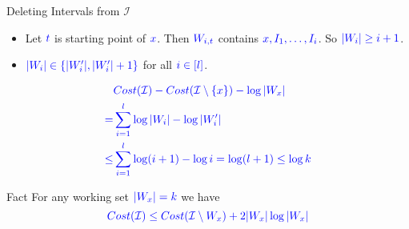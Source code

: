 \documentclass[10pt]{beamer}
\begin{document}
\begin{frame}{Deleting Intervals from $\mathcal{I}$}
	\begin{itemize}
		\item Let $\mathcolor{blue}{t}$ is starting point of $\mathcolor{blue}{x}$. Then $\mathcolor{blue}{W_{i,t}}$ contains $\mathcolor{blue}{x, I_1,\dots, I_i}$. So $\mathcolor{blue}{|W_i|\geq i+1}$.
		\item $\mathcolor{blue}{|W_i|\in\{|W_i'|,|W_i'|+1\}}$ for all $\mathcolor{blue}{i\in[l]}$.
	\end{itemize}
	\begin{align*}
		                       & \mathcolor{blue}{Cost(\mathcal{I})-Cost(\mathcal{I}\setminus \{x\})-\log |W_x|} \\
		\mathcolor{blue}{=}    & \mathcolor{blue}{\sum\limits_{i=1}^l \log|W_i|-\log|W_i'|}                      \\
		\mathcolor{blue}{\leq} & \mathcolor{blue}{\sum\limits_{i=1}^l \log(i+1)-\log i =\log (l+1) \leq \log k}
	\end{align*}

	\begin{alertblock}{Fact}
		For any working set $\mathcolor{blue}{|W_x|=k}$ we have $$\mathcolor{blue}{Cost(\mathcal{I})\leq Cost(\mathcal{I}\setminus W_x)+2|W_x|\log |W_x|}$$
	\end{alertblock}
\end{frame}
\end{document}

